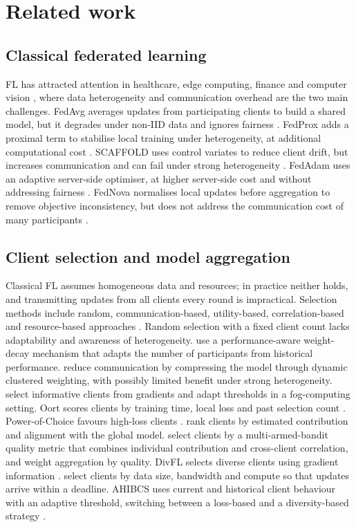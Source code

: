 \documentclass[pdflatex,sn-basic]{sn-jnl}
\begin{document}
\section{Related work}\label{sec2}

\subsection{Classical federated learning}
FL has attracted attention in healthcare, edge computing, finance and computer vision \citep{ahmed2024,darzi2024,khan2024}, where data heterogeneity and communication overhead are the two main challenges. FedAvg averages updates from participating clients to build a shared model, but it degrades under non-IID data and ignores fairness \citep{mcmahan2017}. FedProx adds a proximal term to stabilise local training under heterogeneity, at additional computational cost \citep{li2020}. SCAFFOLD uses control variates to reduce client drift, but increases communication and can fail under strong heterogeneity \citep{karimireddy2020}. FedAdam uses an adaptive server-side optimiser, at higher server-side cost and without addressing fairness \citep{reddi2021}. FedNova normalises local updates before aggregation to remove objective inconsistency, but does not address the communication cost of many participants \citep{wang2020}.

\subsection{Client selection and model aggregation}
Classical FL assumes homogeneous data and resources; in practice neither holds, and transmitting updates from all clients every round is impractical. Selection methods include random, communication-based, utility-based, correlation-based and resource-based approaches \citep{ayeelyan2025}. Random selection with a fixed client count lacks adaptability and awareness of heterogeneity. \citet{li2024} use a performance-aware weight-decay mechanism that adapts the number of participants from historical performance. \citet{tsouvalas2024} reduce communication by compressing the model through dynamic clustered weighting, with possibly limited benefit under strong heterogeneity. \citet{vanthang2025} select informative clients from gradients and adapt thresholds in a fog-computing setting. Oort scores clients by training time, local loss and past selection count \citep{lai2021}. Power-of-Choice favours high-loss clients \citep{cho2022}. \citet{ye2025} rank clients by estimated contribution and alignment with the global model. \citet{zhai2024} select clients by a multi-armed-bandit quality metric that combines individual contribution and cross-client correlation, and weight aggregation by quality. DivFL selects diverse clients using gradient information \citep{balakrishnan2022}. \citet{nishio2019} select clients by data size, bandwidth and compute so that updates arrive within a deadline. AHIBCS uses current and historical client behaviour with an adaptive threshold, switching between a loss-based and a diversity-based strategy \citep{liu2025}.
\end{document}
